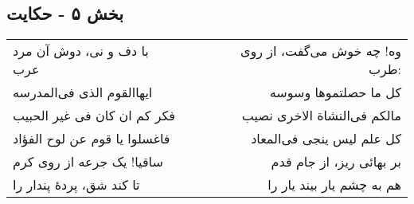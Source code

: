 \begin{center}
\section*{بخش ۵ - حکایت}
\label{sec:005}
\begin{longtable}{l p{0.5cm} r}
با دف و نی، دوش آن مرد عرب
&&
وه! چه خوش می‌گفت، از روی طرب:
\\
ایهاالقوم الذی فی‌المدرسه
&&
کل ما حصلتموها وسوسه
\\
فکر کم ان کان فی غیر الحبیب
&&
مالکم فی‌النشاة الاخری نصیب
\\
فاغسلوا یا قوم عن لوح الفؤاد
&&
کل علم لیس ینجی فی‌المعاد
\\
ساقیا! یک جرعه از روی کرم
&&
بر بهائی ریز، از جام قدم
\\
تا کند شق، پردهٔ پندار را
&&
هم به چشم یار بیند یار را
\\
\end{longtable}
\end{center}
